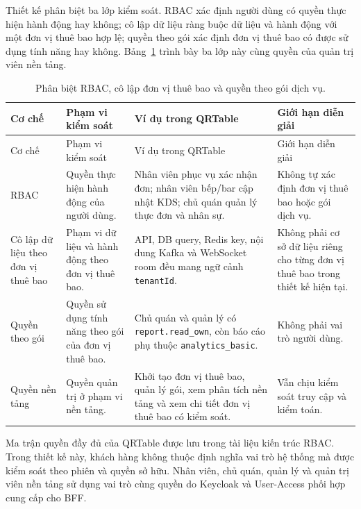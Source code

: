Thiết kế phân biệt ba lớp kiểm soát. RBAC xác định người dùng có quyền thực hiện hành động hay không; cô lập dữ liệu ràng buộc dữ liệu và hành động với một đơn vị thuê bao hợp lệ; quyền theo gói xác định đơn vị thuê bao có được sử dụng tính năng hay không. Bảng~\ref{tab:chapter4-rbac-tenant-entitlement} trình bày ba lớp này cùng quyền của quản trị viên nền tảng.

{\scriptsize
\setlength{\tabcolsep}{3pt}
\begin{longtable}{>{\raggedright\arraybackslash}p{}>{\raggedright\arraybackslash}p{}>{\raggedright\arraybackslash}p{}>{\raggedright\arraybackslash}p{}}
  \caption{Phân biệt RBAC, cô lập đơn vị thuê bao và quyền theo gói dịch vụ.}
  \label{tab:chapter4-rbac-tenant-entitlement}\\
  \toprule
  Cơ chế & Phạm vi kiểm soát & Ví dụ trong QRTable & Giới hạn diễn giải \\
  \midrule
  \endfirsthead
  \toprule
  Cơ chế & Phạm vi kiểm soát & Ví dụ trong QRTable & Giới hạn diễn giải \\
  \midrule
  \endhead
  RBAC & Quyền thực hiện hành động của người dùng. & Nhân viên phục vụ xác nhận đơn; nhân viên bếp/bar cập nhật KDS; chủ quán quản lý thực đơn và nhân sự. & Không tự xác định đơn vị thuê bao hoặc gói dịch vụ. \\
  Cô lập dữ liệu theo đơn vị thuê bao & Phạm vi dữ liệu và hành động theo đơn vị thuê bao. & API, DB query, Redis key, nội dung Kafka và WebSocket room đều mang ngữ cảnh \texttt{tenantId}. & Không phải cơ sở dữ liệu riêng cho từng đơn vị thuê bao trong thiết kế hiện tại. \\
  Quyền theo gói & Quyền sử dụng tính năng theo gói của đơn vị thuê bao. & Chủ quán và quản lý có \texttt{report.read\_own}, còn báo cáo phụ thuộc \texttt{analytics\_basic}. & Không phải vai trò người dùng. \\
  Quyền nền tảng & Quyền quản trị ở phạm vi nền tảng. & Khởi tạo đơn vị thuê bao, quản lý gói, xem phân tích nền tảng và xem chi tiết đơn vị thuê bao có kiểm soát. & Vẫn chịu kiểm soát truy cập và kiểm toán. \\
  \bottomrule
\end{longtable}
}

Ma trận quyền đầy đủ của QRTable được lưu trong tài liệu kiến trúc RBAC. Trong thiết kế này, khách hàng không thuộc định nghĩa vai trò hệ thống mà được kiểm soát theo phiên và quyền sở hữu. Nhân viên, chủ quán, quản lý và quản trị viên nền tảng sử dụng vai trò cùng quyền do Keycloak và User-Access phối hợp cung cấp cho BFF.

